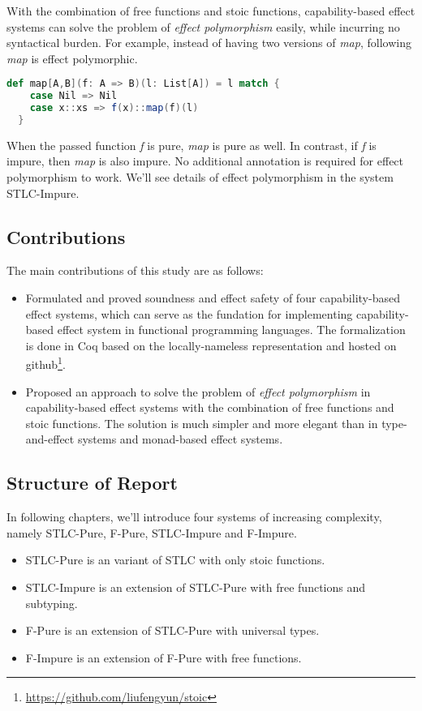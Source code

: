 With the combination of free functions and stoic functions,
capability-based effect systems can solve the problem of \emph{effect
  polymorphism} easily, while incurring no syntactical burden. For
example, instead of having two versions of \emph{map}, following
\emph{map} is effect polymorphic.

\begin{lstlisting}[language=Scala]
  def map[A,B](f: A => B)(l: List[A]) = l match {
    case Nil => Nil
    case x::xs => f(x)::map(f)(l)
  }
\end{lstlisting}

When the passed function \emph{f} is pure, \emph{map} is pure as
well. In contrast, if \emph{f} is impure, then \emph{map} is also
impure. No additional annotation is required for effect polymorphism
to work. We'll see details of effect polymorphism in the system
STLC-Impure.

\subsection{Contributions}

The main contributions of this study are as follows:

\begin{itemize}
\item Formulated and proved soundness and effect safety of four
  capability-based effect systems, which can serve as the fundation
  for implementing capability-based effect system in functional
  programming languages. The formalization is done in Coq based on the
  locally-nameless representation\cite{chargueraud-11-ln} and hosted
  on github\footnote{\url{https://github.com/liufengyun/stoic}}.
\item Proposed an approach to solve the problem of \emph{effect
    polymorphism} in capability-based effect systems with the
  combination of free functions and stoic functions. The solution is
  much simpler and more elegant than in type-and-effect systems and
  monad-based effect systems.
\end{itemize}

\subsection{Structure of Report}

In following chapters, we'll introduce four systems of increasing
complexity, namely STLC-Pure, F-Pure, STLC-Impure and F-Impure.

\begin{itemize}
\item STLC-Pure is an variant of STLC with only stoic functions.
\item STLC-Impure is an extension of STLC-Pure with free functions and subtyping.
\item F-Pure is an extension of STLC-Pure with universal types.
\item F-Impure is an extension of F-Pure with free functions.
\end{itemize}
